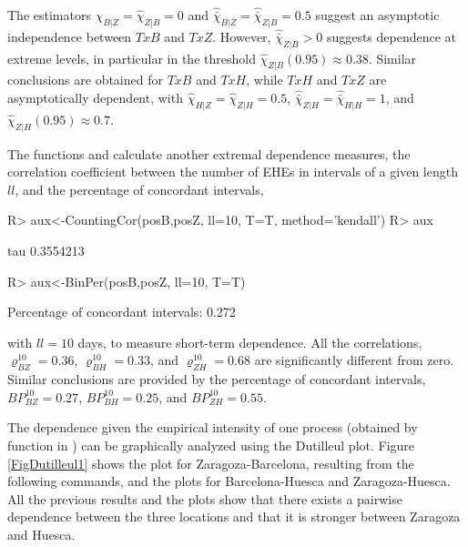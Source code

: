 The   estimators  $\hat \chi_{B|Z}=\hat \chi_{Z|B}=0$ and  $\hat{\bar \chi}_{B|Z}=\hat{\bar \chi}_{Z|B}=0.5$ suggest an asymptotic independence between   $TxB$ and $TxZ$.  However,  $\hat{\bar \chi}_{Z|B}>0$  suggests dependence  at extreme levels, in particular in the threshold   $\hat  \chi_{Z|B}(0.95) \approx 0.38$.  Similar conclusions are obtained for $TxB$ and $TxH$, while $TxH$ and $TxZ$ are asymptotically dependent, with $\hat \chi_{H|Z}=\hat \chi_{Z|H}=0.5$, $\hat{\bar \chi}_{Z|H}=\hat{\bar \chi}_{H|H}=1$, and   $\hat  \chi_{Z|H}(0.95) \approx 0.7$.

The functions   and  calculate another extremal dependence  measures,  the correlation coefficient between the number of EHEs in intervals of a given length $ll$, and  the percentage of  concordant intervals,

\begin{example}
R> aux<-CountingCor(posB,posZ, ll=10, T=T, method='kendall')
R> aux

  tau 
  0.3554213  

R> aux<-BinPer(posB,posZ, ll=10, T=T)

  Percentage of concordant intervals:  0.272
\end{example}
with $ll=10$ days,  to measure short-term dependence. All the correlations,  $\varrho_{BZ}^{10}=0.36$,  $\varrho_{BH}^{10}=0.33$, and $\varrho_{ZH}^{10}=0.68$ are  significantly different  from zero.   Similar conclusions are provided by the percentage of  concordant intervals,  $BP_{BZ}^{10}=0.27$,  $BP_{BH}^{10}=0.25$, and $BP_{ZH}^{10}=0.55$.



The dependence given  the empirical intensity of  one process (obtained by  function  in ) can be graphically analyzed using the Dutilleul plot. Figure \ref{FigDutilleul1}  shows the plot  for Zaragoza-Barcelona, resulting  from the following   commands, and  the  plots for  Barcelona-Huesca and Zaragoza-Huesca. 		All the previous results and the plots show that there exists a pairwise  dependence between the  three locations and  that it is stronger between Zaragoza and Huesca. 
 
	
